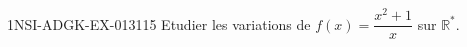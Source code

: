 \begin{exercice}{1NSI-ADGK-EX-013}{1}{15}
Etudier les variations de $f(x) = \dfrac{x^2+1}{x}$ sur $\mathbb{R}^*$.

\end{exercice}

